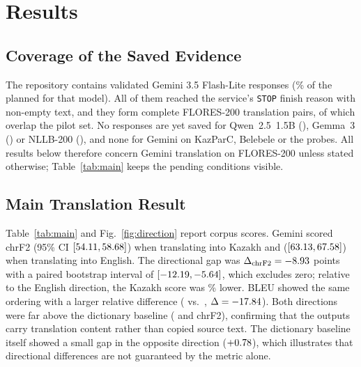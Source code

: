 \section{Results}
\label{sec:results}

\subsection{Coverage of the Saved Evidence}
The repository contains \CovGemini{} validated Gemini 3.5 Flash-Lite responses (\CovPct\% of the \NPromptsPerModel{} planned for that model). All of them reached the service's \texttt{STOP} finish reason with non-empty text, and they form \NPairs{} complete FLORES-200 translation pairs, \NPilotOverlap{} of which overlap the pilot set. No responses are yet saved for Qwen~2.5~1.5B (\CovQwen), Gemma~3 (\CovGemma) or NLLB-200 (\CovNLLB), and none for Gemini on KazParC, Belebele or the probes. All results below therefore concern Gemini translation on FLORES-200 unless stated otherwise; Table~\ref{tab:main} keeps the pending conditions visible.

\subsection{Main Translation Result}
Table~\ref{tab:main} and Fig.~\ref{fig:direction} report corpus scores. Gemini scored \GemChrfKK{} chrF2 (95\% CI $[54.11, 58.68]$) when translating into Kazakh and \GemChrfEN{} ($[63.13, 67.58]$) when translating into English. The directional gap was $\Delta_{\mathrm{chrF2}} = -8.93$ points with a paired bootstrap interval of $[-12.19, -5.64]$, which excludes zero; relative to the English direction, the Kazakh score was \GemRelGapPct\% lower. BLEU showed the same ordering with a larger relative difference (\GemBleuKK{} vs.\ \GemBleuEN{}, $\Delta = -17.84$). Both directions were far above the dictionary baseline (\DictChrfKK{} and \DictChrfEN{} chrF2), confirming that the outputs carry translation content rather than copied source text. The dictionary baseline itself showed a small gap in the opposite direction ($+0.78$), which illustrates that directional differences are not guaranteed by the metric alone.

\begin{table}[!t]
\centering
\caption{Translation Quality on \NPairs{} Paired FLORES-200 Items. Corpus Scores With 95\% Paired Bootstrap Intervals; Gap = EN$\rightarrow$KK Minus KK$\rightarrow$EN (Negative = Lower Quality Into Kazakh). Pending Systems Have No Saved Outputs Yet.}
\label{tab:main}
\small

\end{table}

